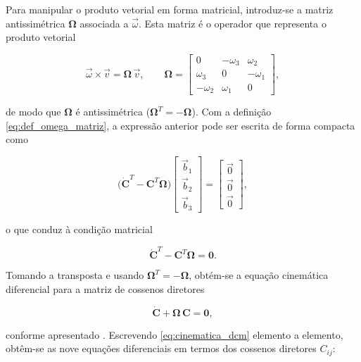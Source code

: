 Para manipular o produto vetorial em forma matricial, introduz-se a matriz antissimétrica $\boldsymbol{\Omega}$ associada a $\vec{\omega}$. Esta matriz é o operador que representa o produto vetorial

\begin{equation}
\vec{\omega}\times\vec{v}
=
\boldsymbol{\Omega}\,\vec{v},
\qquad
\boldsymbol{\Omega}
=
\begin{bmatrix}
0      & -\omega_3 &  \omega_2 \\
\omega_3 & 0       & -\omega_1 \\
-\omega_2 & \omega_1 & 0
\end{bmatrix},
\label{eq:def_omega_matriz}
\end{equation}

de modo que $\boldsymbol{\Omega}$ é antissimétrica ($\boldsymbol{\Omega}^{T} = -\boldsymbol{\Omega}$).
Com a definição \eqref{eq:def_omega_matriz}, a expressão anterior pode ser escrita de forma compacta como

\begin{equation}
\big(\dot{\mathbf{C}}^{T} - \mathbf{C}^{T}\boldsymbol{\Omega}\big)
\begin{bmatrix}
\vec{b}_1 \\
\vec{b}_2 \\
\vec{b}_3
\end{bmatrix}
=
\begin{bmatrix}
\vec{0} \\
\vec{0} \\
\vec{0}
\end{bmatrix},
\end{equation}

o que conduz à condição matricial

\begin{equation}
\dot{\mathbf{C}}^{T} - \mathbf{C}^{T}\boldsymbol{\Omega} = \mathbf{0}.
\end{equation}

Tomando a transposta e usando $\boldsymbol{\Omega}^{T} = -\boldsymbol{\Omega}$, obtém-se a equação cinemática diferencial para a matriz de cossenos diretores

\begin{equation}
\dot{\mathbf{C}} + \boldsymbol{\Omega}\,\mathbf{C} = \mathbf{0},
\label{eq:cinematica_dcm}
\end{equation}

conforme apresentado \cite{wie2008space}.
Escrevendo \eqref{eq:cinematica_dcm} elemento a elemento, obtêm-se as nove equações diferenciais em termos dos cossenos diretores $C_{ij}$:

